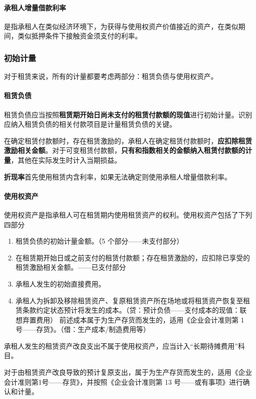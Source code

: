 \documentclass[UTF8,12pt]{ctexart}
\numberwithin{equation}{section} %
\numberwithin{figure}{section}
\numberwithin{table}{section}
\begin{document}
	\paragraph{承租人增量借款利率}是指承租人在类似经济环境下，为获得与使用权资产价值接近的资产，在类似期间，类似抵押条件下接触资金须支付的利率。
	
	\subsubsection{初始计量}
	对于租赁来说，所有的计量都要考虑两部分：租赁负债与使用权资产。
	\paragraph{租赁负债}
	租赁负债应当按照\textbf{租赁期开始日尚未支付的租赁付款额的现值}进行初始计量。识别应纳入租赁负债的相关付款项目是计量租赁负债的关键。
	
	在确定租赁付款额时，存在租赁激励的，承租人在确定租赁付款额时，\textbf{应扣除租赁激励相关金额}。对于可变租赁付款额，\textbf{只有和指数相关的金额纳入租赁付款额的计量}，其他在实际发生时计入当期损益。
	
	\textbf{折现率}首先使用租赁内含利率，如果无法确定则使用承租人增量借款利率。
	
	\paragraph{使用权资产}
	使用权资产是指承租人可在租赁期内使用租赁资产的权利。使用权资产包括了下列四部分
	\begin{enumerate}
		\item 租赁负债的初始计量金额。（5 个部分——未支付部分）
		
		\item 在租赁期开始日或之前支付的租赁付款额；存在租赁激励的，应扣除已享受的租赁激励相关金额。——已支付部分
		
		\item 承租人发生的初始直接费用。
		
		\item 承租人为拆卸及移除租赁资产、复原租赁资产所在场地或将租赁资产恢复至租赁条款约定状态预计将发生的成本。（贷：预计负债——支付成本的现值：联想弃置费用）
		前述成本属于为生产存货而发生的，适用《企业会计准则第 1 号——存货》。（借：生产成本/制造费用等） 
	\end{enumerate}
	承租人发生的租赁资产改良支出不属于使用权资产，应当计入“长期待摊费用”科目。
	
	对于由租赁资产改良导致的预计复原支出，属于为生产存货而发生的，适用《企业会计准则第1号——存货》，并按照《企业会计准则第 13 号——或有事项》进行确认和计量。
	
\end{document}
